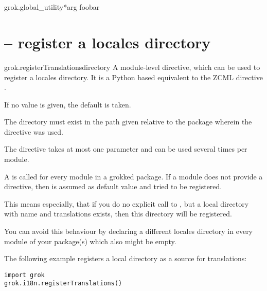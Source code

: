     \section{}

        \begin{funcdesc}{grok.global_utility}{*arg}
        foobar
        \end{funcdesc}

    \section{ -- register a
      locales directory}

        \begin{funcdesc}{grok.registerTranslations}{directory}
          A module-level directive, which can be used to register
          a locales directory. It is a Python based equivalent to the
          ZCML directive .

          If no value is given, the default  is taken.

          The directory must exist in the path given relative to the
          package wherein the directive was used.

          The directive takes at most one parameter and can be used
          several times per module.

          A  is called for every module in a
          grokked package. If a module does not provide a
           directive, then
           is assumed as default value and tried to be
          registered.

          This means especially, that if you do no explicit call to
          , but a local directory with
          name  and translations exists, then this
          directory will be registered.

          You can avoid this behaviour by declaring a different
          locales directory in every module of your package(s) which
          also might be empty.

          The following example registers a local 
          directory as a source for translations:

          \begin{verbatim}
import grok
grok.i18n.registerTranslations()
          \end{verbatim}


\end{funcdesc}
